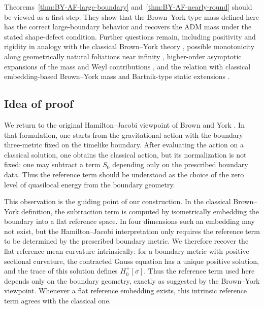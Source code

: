 \documentclass[10pt,a4paper]{amsart}
\begin{document}
	
	
	
	
	Theorems~\ref{thm:BY-AF-large-boundary} and~\ref{thm:BY-AF-nearly-round} should be viewed as a first step. They show that the
	Brown--York type mass defined here has the correct large-boundary behavior and
	recovers the ADM mass under the stated shape-defect condition. Further
	questions remain, including positivity and rigidity in analogy with the
	classical Brown--York theory \cite{ShiTam02}, possible monotonicity along
	geometrically natural foliations near infinity \cite{HuiskenIlmanen,HuiskenYau},
	higher-order asymptotic expansions of the mass and Weyl contributions
	\cite{BH,WY}, and the relation with classical embedding-based Brown--York mass
	and Bartnik-type static extensions
	\cite{BrownYork,FanShiTam,LiWeinstein,Bartnik89,MiaoShiTam,Anderson13,McCormick24}.
	
	
	\subsection{Idea of proof}
	
	We return to the original
	Hamilton--Jacobi viewpoint of Brown and York \cite{BrownYork}. In that
	formulation, one starts from the gravitational action with the boundary
	three-metric fixed on the timelike boundary. After evaluating the action on a classical solution, one obtains the classical action, but its normalization is not fixed: one may subtract a term $S_0$ depending only on the prescribed boundary data. Thus the reference term should be understood as the choice of the zero level of quasilocal energy from the boundary geometry.
	
	This observation is the guiding point of our construction. In the classical
	Brown--York definition, the subtraction term is computed by isometrically
	embedding the boundary into a flat reference space. In four dimensions such an
	embedding may not exist, but the Hamilton--Jacobi interpretation only requires
	the reference term to be determined by the prescribed boundary metric. We
	therefore recover the flat reference mean curvature intrinsically: for a
	boundary metric with positive sectional curvature, the contracted Gauss
	equation has a unique positive solution, and the trace of this solution defines
	$H_0^+[\sigma]$. Thus the reference term used here depends only on the boundary
	geometry, exactly as suggested by the Brown--York viewpoint. Whenever a flat
	reference embedding exists, this intrinsic reference term agrees with the
	classical one.
	
\end{document}
